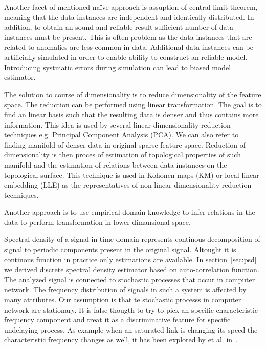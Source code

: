 Another facet of mentioned na\"ive approach is assuption of central limit theorem, 
meaning that the data instances are independent and identically distributed. 
In addition, to obtain an sound and reliable result sufficient number of data instances 
must be present. This is often problem as the data instances that are related to anomalies 
are less common in data. Additional data instances can be artificially simulated in order 
to enable ability to construct an reliable model. Introducing  systmatic errors during 
simulation can lead to biased model estimator. %

The solution to course of dimensionality is to reduce dimensionality of the feature space.
The reduction can be performed using  linear transformation. The goal is to find an 
linear basis such that the resulting data is denser and thus contains more information.
This idea is used by several linear dimensionality reduction techniques e.g. Principal 
Component Analysis (PCA).
We can also refer to finding manifold of denser data in original sparse feature space.
Reduction of dimensionality is then proces of estimation of topological properties of such 
manifold and the estimation of relations between data instances on the topological surface.
This technique is used in Kohonen maps (KM) or local linear  embedding (LLE) as the 
representatives of non-linear dimensionality reduction techniques.
 
Another approach is to use empirical domain knowledge to infer relations in the
data to perform transformation in lower dimansional space.

Spectral density of a signal in time domain represents continous decomposition of signal to
periodic components present in the original signal. Altought it is continous function in
practice only estimations are available. In section~\ref{sec:psd} we derived discrete
spectral density estimator based on auto-correlation function. 
The analyzed signal is connected to stochastic processes
that occur in computer network. The frequency distribution of signals in such a system is 
affected by many attributes. Our assumption is that te stochastic processs in computer network
are stationary. It is false thougth to try to pick an specific characteristic frequency component
and treat it as a discriminative feature for specific undelaying process. As example when an 
saturated link is changing its speed the characteristic frequency changes as well, it has been
explored by  et al. in~\cite{he2004spectral}.

